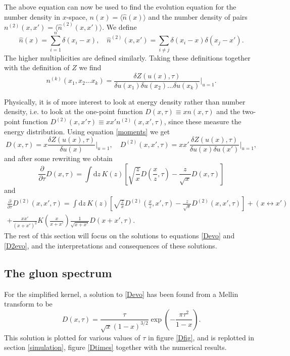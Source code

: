 \documentclass[a4paper,12pt]{article}
\newcommand{\party}[2]{\frac{\partial{#1}}{\partial{#2}}}
\numberwithin{equation}{section}
\begin{document}
The above equation can now be used to find the evolution equation for the number density in $x$-space,  $n(x)=\langle \hat{n} (x)\rangle$ and the number density of pairs $n^{(2)}(x,x') = \langle \hat{n}^{(2)}(x,x') \rangle $. We define 
\begin{equation}
\hat{n}(x)=\sum_{i=1}^n \delta(x_i-x), \quad \hat{n}^{(2)}(x,x')=\sum_{i \neq j} \delta(x_i-x)\delta(x_j-x').
\end{equation}
The higher multiplicities are defined similarly. Taking these definitions together with the definition of $Z$ we find
\begin{equation}\label{moments}
n^{(k)}(x_1,x_2...x_k)=\frac{\delta Z(u(x),\tau)}{\delta u(x_1)\delta u(x_2)...\delta u(x_k)}\Bigg|_{u=1}.
\end{equation}

Physically, it is of more interest to look at energy density rather than number density, i.e. to look at the one-point function $D(x,\tau)\equiv xn(x,\tau)$ and the two-point function $D^{(2)}(x,x'\tau)\equiv xx'n^{(2)}(x,x',\tau)$, since these measure the energy distribution. Using equation \eqref{moments} we get
\begin{equation}
D(x,\tau)=x \frac{\delta Z(u(x),\tau)}{\delta u(x)}\Bigg|_{u=1},\quad D^{(2)}(x,x',\tau)=xx' \frac{\delta Z(u(x),\tau)}{\delta u(x)\delta u(x')}\Bigg|_{u=1},
\end{equation}
and after some rewriting we obtain
\begin{equation}\label{Devo}
\party{}{\tau}D(x,\tau)=\int \mathrm{d}z\, K(z) \left[\sqrt{\frac{z}{x}} D\left(\frac{x}{z},\tau\right)- \frac{z}{\sqrt{x}}D(x,\tau)  \right]
\end{equation}
and
\begin{multline}\label{D2evo}
\party{}{\tau}D^{(2)}(x,x',\tau)=\int \mathrm{d}z\, K(z) \left[ \sqrt{\frac{z}{x}} D^{(2)}\left(\frac{x}{z},x',\tau\right) - \frac{z}{\sqrt{x}} D^{(2)}(x,x',\tau)\right]+(x \leftrightarrow x') \\
+ \frac{xx'}{(x+x')^2} K\left(\frac{x}{x+x'}\right) \frac{1}{\sqrt{x+x'}} D(x+x',\tau).
\end{multline}
The rest of this section will focus on the solutions to equations \eqref{Devo} and \eqref{D2evo}, and the interpretations and consequences of these solutions.

\subsection{The gluon spectrum}\label{onepoint}
For the simplified kernel, a solution to \eqref{Devo} has been found from a Mellin transform to be\cite{Blaizot:2013hx}
\begin{equation}\label{Mellin}
D(x,\tau) = \frac{\tau}{\sqrt{x}(1-x)^{3/2}}\exp\left(-\frac{\pi \tau^2}{1-x}\right).
\end{equation}
This solution is plotted for various values of $\tau$ in figure \ref{Dfig}, and is replotted in section \ref{simulation}, figure \ref{Dtimes} together with the numerical results.
\end{document}
